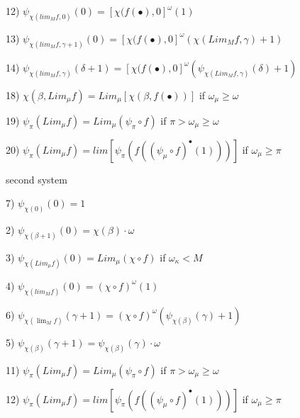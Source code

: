 \documentclass[10pt]{article}
\begin{document}
12) \( \psi_{\chi(lim_M f,0)}(0) = [\chi(f(\bullet),0]^\omega (1) \)

13) \( \psi_{\chi(lim_M f,\gamma+1)}(0) = [\chi(f(\bullet),0]^\omega (\chi(Lim_M f,\gamma)+1) \)

14) \( \psi_{\chi(lim_M f,\gamma)}(\delta+1) = [\chi(f(\bullet),0]^\omega (\psi_{\chi(Lim_M f,\gamma)}(\delta)+1) \)

\bigskip

18) \( \chi(\beta,Lim_\mu f) = Lim_\mu [\chi(\beta,f(\bullet))] \) if \( \omega_\mu \ge \omega \)

19) \( \psi_\pi(Lim_\mu f) = Lim_\mu (\psi_\pi \circ f) \) if \( \pi > \omega_\mu \ge \omega \)

20) \( \psi_\pi(Lim_\mu f) = lim [ \psi_\pi(f((\psi_\mu \circ f)^\bullet(1))) ] \) if \( \omega_\mu \ge \pi \)

\bigskip

second system

\bigskip

7) \( \psi_{\chi(0)}(0) = 1 \)

2) \( \psi_{\chi(\beta+1)}(0) = \chi(\beta) \cdot \omega \)

3) \( \psi_{\chi(Lim_\mu f)}(0) = Lim_\mu(\chi \circ f) \) if \( \omega_\kappa < M \)

4) \( \psi_{\chi(lim_M f)}(0) = (\chi \circ f)^\omega (1) \)

6) \( \psi_{\chi(\lim_M f)}(\gamma+1) = (\chi \circ f)^\omega (\psi_{\chi(\beta)}(\gamma)+1) \)

5) \( \psi_{\chi(\beta)}(\gamma+1) = \psi_{\chi(\beta)}(\gamma) \cdot \omega \)

11) \( \psi_\pi (Lim_\mu f) = Lim_\mu (\psi_\pi \circ f) \) if \( \pi > \omega_\mu \ge \omega \)

12) \( \psi_\pi (Lim_\mu f) = lim [\psi_\pi(f((\psi_\mu \circ f)^\bullet(1)))] \) if \( \omega_\mu \ge \pi \)
\end{document}
